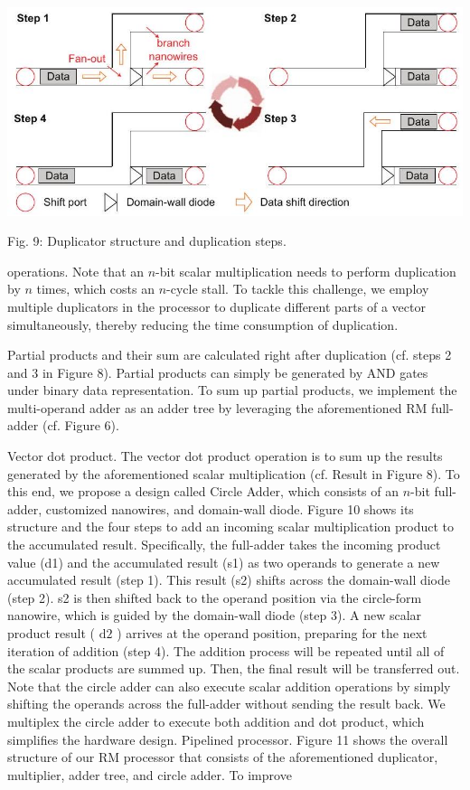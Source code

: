 \documentclass[10pt]{article}
\begin{document}
\begin{center}
\includegraphics[max width=\textwidth]{2024_05_12_abeba8a85da5b5ec4c7bg-05}
\end{center}

Fig. 9: Duplicator structure and duplication steps.

operations. Note that an $n$-bit scalar multiplication needs to perform duplication by $n$ times, which costs an $n$-cycle stall. To tackle this challenge, we employ multiple duplicators in the processor to duplicate different parts of a vector simultaneously, thereby reducing the time consumption of duplication.

Partial products and their sum are calculated right after duplication (cf. steps 2 and 3 in Figure 8). Partial products can simply be generated by AND gates under binary data representation. To sum up partial products, we implement the multi-operand adder as an adder tree by leveraging the aforementioned RM full-adder (cf. Figure 6).

Vector dot product. The vector dot product operation is to sum up the results generated by the aforementioned scalar multiplication (cf. Result in Figure 8). To this end, we propose a design called Circle Adder, which consists of an $n$-bit full-adder, customized nanowires, and domain-wall diode. Figure 10 shows its structure and the four steps to add an incoming scalar multiplication product to the accumulated result. Specifically, the full-adder takes the incoming product value (d1) and the accumulated result (s1) as two operands to generate a new accumulated result (step 1). This result (s2) shifts across the domain-wall diode (step 2). s2 is then shifted back to the operand position via the circle-form nanowire, which is guided by the domain-wall diode (step 3). A new scalar product result ( $\mathrm{d} 2$ ) arrives at the operand position, preparing for the next iteration of addition (step 4). The addition process will be repeated until all of the scalar products are summed up. Then, the final result will be transferred out. Note that the circle adder can also execute scalar addition operations by simply shifting the operands across the full-adder without sending the result back. We multiplex the circle adder to execute both addition and dot product, which simplifies the hardware design. Pipelined processor. Figure 11 shows the overall structure of our RM processor that consists of the aforementioned duplicator, multiplier, adder tree, and circle adder. To improve
\end{document}
